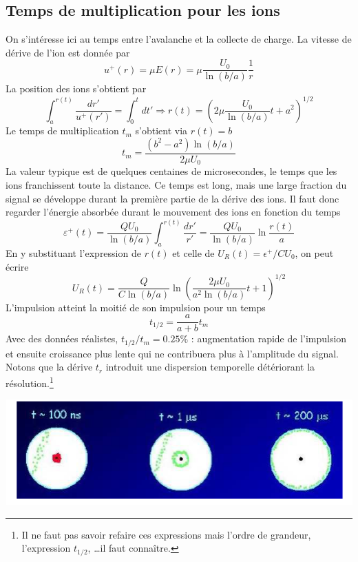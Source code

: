 \subsection{Temps de multiplication pour les ions}%
On s'intéresse ici au temps entre l'avalanche et la collecte de charge. La vitesse de dérive de
l'ion est donnée par
\begin{equation}
u^+(r)=\mu E(r)=\mu\frac{U_0}{\ln{(b/a)}}\frac{1}{r}
\end{equation}
La position des ions s'obtient par
\begin{equation}
\int_a^{r(t)}\frac{dr'}{u^+(r')}=\int_0^{t}dt' \Rightarrow r(t)=\left(2\mu\frac{U_0}{\ln{(b/a)}}t+a^2\right)^{1/2}
\end{equation}
Le temps de multiplication $t_m$ s'obtient via $r(t)=b$
\begin{equation}
t_m=\frac{(b^2-a^2)\ln{(b/a)}}{2\mu U_0}
\end{equation}
La valeur typique est de quelques centaines de microsecondes, le temps que les ions franchissent
toute la distance. Ce temps est long, mais une large fraction du signal se développe durant la
première partie de la dérive des ions. Il faut donc regarder l'énergie absorbée durant le 
mouvement des ions en fonction du temps 
\begin{equation}
\varepsilon^+(t)=\frac{QU_0}{\ln{(b/a)}}\int_a^{r(t)}\frac{dr'}{r'}=\frac{QU_0}{\ln{(b/a)}}\ln{\frac{r(t)}{a}}
\end{equation}
En y substituant l'expression de $r(t)$ et celle de $U_R(t) = \epsilon^+/CU_0$, on peut écrire
\begin{equation}
U_R(t)=\frac{Q}{C\ln{(b/a)}}\ln{\left(\frac{2\mu U_0}{a^2\ln{(b/a)}}t+1\right)^{1/2}}
\end{equation}
L'impulsion atteint la moitié de son impulsion pour un temps
\begin{equation}
t_{1/2}=\frac{a}{a+b}t_m
\end{equation}
Avec des données réalistes, $t_{1/2}/t_m = 0.25\%$ : augmentation rapide de l'impulsion et ensuite
croissance plus lente qui ne contribuera plus à l'amplitude du signal. Notons que la dérive $t_r$
introduit une dispersion temporelle détériorant la résolution.\footnote{Il ne faut pas savoir 
refaire ces expressions mais l'ordre de grandeur, l'expression $t_{1/2}$, \dots il faut connaître.}
\begin{center}
	\includegraphics[scale=0.5]{ch8/image8}
\end{center}

